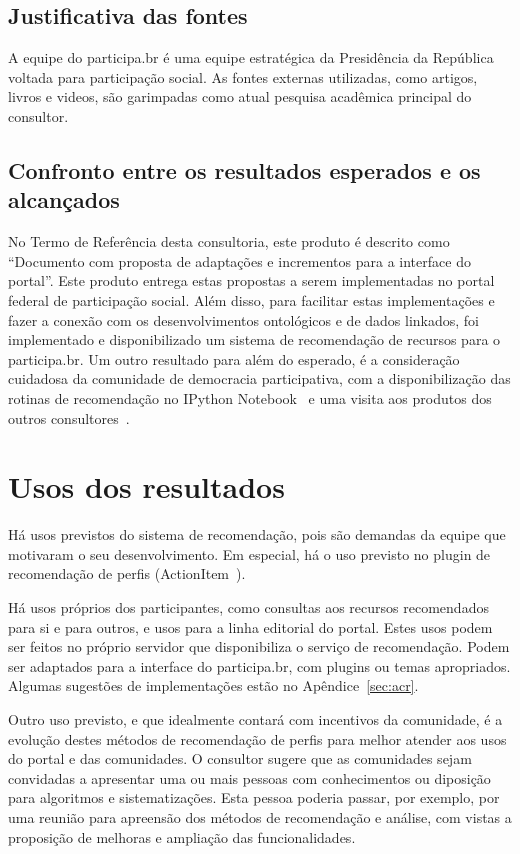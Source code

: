\documentclass[12pt]{article}
\begin{document}
\subsection{Justificativa das fontes}
A equipe do participa.br é uma equipe estratégica da Presidência da República voltada para participação social. As fontes externas utilizadas, como artigos, livros e videos, são garimpadas como atual pesquisa acadêmica principal do consultor.
\subsection{Confronto entre os resultados esperados e os alcançados}
No Termo de Referência desta consultoria, este produto é descrito como ``Documento com proposta de adaptações e incrementos para a interface do portal''. Este produto entrega estas propostas a serem implementadas no portal federal de participação social. Além disso, para facilitar estas implementações e fazer a conexão com os desenvolvimentos ontológicos e de dados linkados, foi implementado e disponibilizado um sistema de recomendação de recursos para o participa.br. Um outro resultado para além do esperado, é a consideração cuidadosa da comunidade de democracia participativa, com a disponibilização das rotinas de recomendação no IPython Notebook~\cite{iNotebook} e uma visita aos produtos dos outros consultores~\cite{prodExtra}.

\section{Usos dos resultados}\label{sec:uso}
Há usos previstos do sistema de recomendação, pois são demandas da equipe que motivaram o seu desenvolvimento. Em especial, há o uso previsto no plugin de recomendação de perfis (ActionItem~\cite{actionItem}).

Há usos próprios dos participantes, como consultas aos recursos recomendados para si e para outros, e usos para a linha editorial do portal. Estes usos podem ser feitos no próprio servidor que disponibiliza o serviço de recomendação. Podem ser adaptados para a interface do participa.br, com plugins ou temas apropriados. Algumas sugestões de implementações estão no Apêndice~\ref{sec:acr}.

Outro uso previsto, e que idealmente contará com incentivos da comunidade, é a evolução destes métodos de recomendação de perfis para melhor atender aos usos do portal e das comunidades. O consultor sugere que as comunidades sejam convidadas a apresentar uma ou mais pessoas com conhecimentos ou diposição para algoritmos e sistematizações. Esta pessoa poderia passar, por exemplo, por uma reunião para apreensão dos métodos de recomendação e análise, com vistas a proposição de melhoras e ampliação das funcionalidades.
\end{document}
